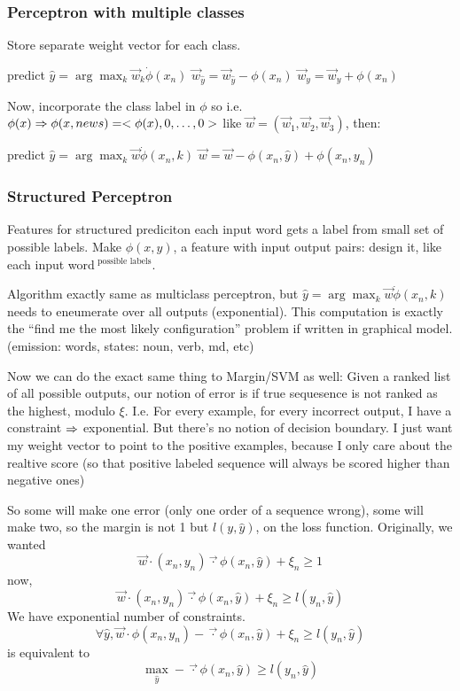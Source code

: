 \subsubsection{Perceptron with multiple classes}

Store separate weight vector for each class.
\begin{algorithmic}
\STATE predict $\hat y = \arg\max_k \vec w_k \dot \phi(x_n)$
\STATE $\vec w_{\hat y} = \vec w_{\hat y} - \phi(x_n)$
\STATE $\vec w_{ y} = \vec w_{ y} + \phi(x_n)$
\ENDIF
\ENDFOR
\end{algorithmic}

Now, incorporate the class label in $\phi$ so i.e. $\phi(x) \Rightarrow
\phi(x,news) = <\phi(x), 0,\dots, 0>$
like $\vec w = (\vec w_1, \vec w_2, \vec w_3)$, then:
\begin{algorithmic}
\STATE predict $\hat y = \arg\max_k \vec w \dot \phi(x_n, k)$
\STATE $\vec w = \vec w - \phi(x_n,\hat y) + \phi(x_n, y_n)$
\ENDIF
\ENDFOR
\end{algorithmic}
\subsubsection{Structured Perceptron}


Features for structured prediciton each input word gets a label from
small set of possible labels.
Make $\phi(x,y)$, a feature with input output pairs: design it, like
each input word$^{\text{ possible labels}}$.

Algorithm exactly same as multiclass perceptron, but $\hat y =
\arg\max_k \vec w \dot \phi(x_n, k)$ needs to eneumerate over all
outputs (exponential). This computation is exactly the ``find me the
most likely configuration'' problem if written in graphical
model. (emission: words, states: noun, verb, md, etc)

Now we can do the exact same thing to Margin/SVM as well:
Given a ranked list of all possible outputs, our notion of error is if
true sequesence is not ranked as the highest, modulo $\xi$. I.e. For every
example, for every incorrect output, I have a constraint $\Rightarrow$
exponential. But there's no notion of decision boundary. I just want
my weight vector to point to the positive examples, because I only
care about the realtive score (so that positive labeled sequence will
always be scored higher than negative ones)

So some will make one error (only one order  of a sequence wrong),
some will make two, so the margin is not 1 but $l(y,\hat y)$, on the
loss function.
Originally, we wanted $$\vec w \cdot (x_n, y_n) \vec \cdot \phi(x_n,\hat y) + \xi_n \ge 1$$ now, 
$$\vec w \cdot (x_n, y_n) \vec \cdot \phi(x_n,\hat y) + \xi_n \ge
l(y_n, \hat y)$$
We have exponential number of constraints.
$$\forall \hat y, \vec w \cdot \phi(x_n, y_n) - \vec \cdot \phi(x_n,\hat y) +\xi_n \ge l(y_n, \hat y)$$ is equivalent to
$$\max_{\hat y}-\vec \cdot \phi(x_n,\hat y) \ge l(y_n, \hat y)$$

